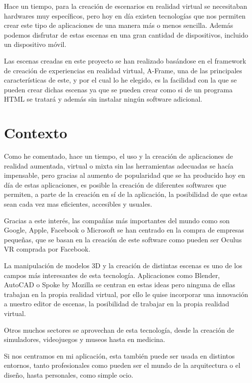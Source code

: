 \documentclass[a4paper, 12pt]{book}
\begin{document}
Hace un tiempo, para la creación de escenarios en realidad virtual se necesitaban hardwares muy específicos, pero hoy en día existen tecnologías que nos permiten crear este tipo de aplicaciones de una manera más o menos sencilla. Además podemos disfrutar de estas escenas en una gran cantidad de dispositivos, incluido un dispositivo móvil.

Las escenas creadas en este proyecto se han realizado basándose en el framework de creación de experiencias en realidad virtual, A-Frame, una de las principales características de este, y por el cual lo he elegido, es la facilidad con la que se pueden crear dichas escenas ya que se pueden crear como si de un programa HTML se tratará y además sin instalar ningún software adicional.

\section{Contexto}
\label{sec:contexto}

Como he comentado, hace un tiempo, el uso y la creación de aplicaciones de realidad aumentada, virtual o mixta sin las herramientas adecuadas se hacía impensable, pero gracias al aumento de popularidad que se ha producido hoy en día de estas aplicaciones, es posible la creación de diferentes softwares que permiten, a parte de la creación en sí de la aplicación, la posibilidad de que estas sean cada vez mas eficientes, accesibles y usuales.

Gracias a este interés, las compañías más importantes del mundo como son Google, Apple, Facebook o Microsoft se han centrado en la compra de empresas pequeñas, que se basan en la creación de este software como pueden ser Oculus VR comprada por Facebook. 

La manipulación de modelos 3D y la creación de distintas escenas es uno de los campos más interesantes de esta tecnología. Aplicaciones como Blender, AutoCAD o Spoke by Mozilla se centran en estas ideas pero ninguna de ellas trabajan en la propia realidad virtual, por ello le quise incorporar una innovación a nuestro editor de escenas, la posibilidad de trabajar en la propia realidad virtual.

Otros muchos sectores se aprovechan de esta tecnología, desde la creación de  simuladores, videojuegos y museos hasta en medicina.

Si nos centramos en mi aplicación, esta también puede ser usada en distintos entornos, tanto profesionales como pueden ser el mundo de la arquitectura o el diseño, hasta personales, como simple ocio.
\end{document}
